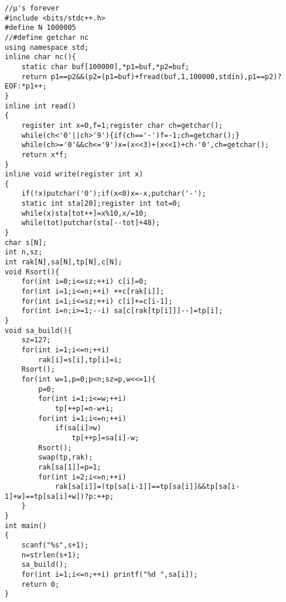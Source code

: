 \begin{verbatim}
//μ's forever
#include <bits/stdc++.h>
#define N 1000005
//#define getchar nc
using namespace std;
inline char nc(){
    static char buf[100000],*p1=buf,*p2=buf;
    return p1==p2&&(p2=(p1=buf)+fread(buf,1,100000,stdin),p1==p2)?EOF:*p1++;
}
inline int read()
{
    register int x=0,f=1;register char ch=getchar();
    while(ch<'0'||ch>'9'){if(ch=='-')f=-1;ch=getchar();}
    while(ch>='0'&&ch<='9')x=(x<<3)+(x<<1)+ch-'0',ch=getchar();
    return x*f;
}
inline void write(register int x)
{
    if(!x)putchar('0');if(x<0)x=-x,putchar('-');
    static int sta[20];register int tot=0;
    while(x)sta[tot++]=x%10,x/=10;
    while(tot)putchar(sta[--tot]+48);
}
char s[N];
int n,sz;
int rak[N],sa[N],tp[N],c[N];
void Rsort(){
    for(int i=0;i<=sz;++i) c[i]=0;
    for(int i=1;i<=n;++i) ++c[rak[i]];
    for(int i=1;i<=sz;++i) c[i]+=c[i-1];
    for(int i=n;i>=1;--i) sa[c[rak[tp[i]]]--]=tp[i];
}
void sa_build(){
    sz=127;
    for(int i=1;i<=n;++i)
        rak[i]=s[i],tp[i]=i;
    Rsort();
    for(int w=1,p=0;p<n;sz=p,w<<=1){
        p=0;
        for(int i=1;i<=w;++i)
            tp[++p]=n-w+i;
        for(int i=1;i<=n;++i)
            if(sa[i]>w)
                tp[++p]=sa[i]-w;
        Rsort();
        swap(tp,rak);
        rak[sa[1]]=p=1;
        for(int i=2;i<=n;++i)
            rak[sa[i]]=(tp[sa[i-1]]==tp[sa[i]]&&tp[sa[i-1]+w]==tp[sa[i]+w])?p:++p;
    }
}
int main()
{
    scanf("%s",s+1);
    n=strlen(s+1);
    sa_build();
    for(int i=1;i<=n;++i) printf("%d ",sa[i]);
    return 0;
}
\end{verbatim}
